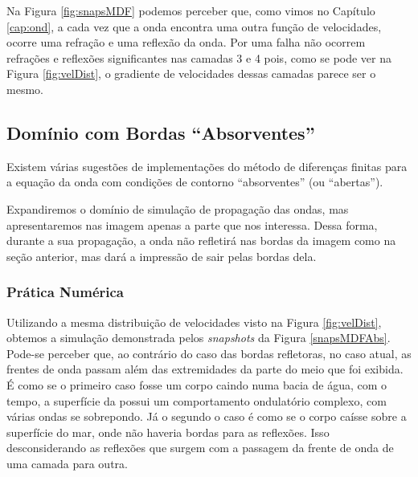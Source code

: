                 Na Figura \ref{fig:snapsMDF} podemos perceber que, como vimos no Capítulo \ref{cap:ond}, a cada vez que a onda encontra uma outra função de velocidades, ocorre uma refração e uma reflexão da onda. Por uma falha não ocorrem refrações e reflexões significantes nas camadas 3 e 4 pois, como se pode ver na Figura \ref{fig:velDist}, o gradiente de velocidades dessas camadas parece ser o mesmo.

	    \subsection{Domínio com Bordas ``Absorventes''}
	        
            Existem várias sugestões de implementações do método de diferenças finitas para a equação da onda com condições de contorno ``absorventes'' (ou ``abertas''). 
            
            Expandiremos o domínio de simulação de propagação das ondas, mas apresentaremos nas imagem apenas a parte que nos interessa. Dessa forma, durante a sua propagação, a onda não refletirá nas bordas da imagem como na seção anterior, mas dará a impressão de sair pelas bordas dela.
	        
            \subsubsection{Prática Numérica}
            
                Utilizando a mesma distribuição de velocidades visto na Figura \ref{fig:velDist}, obtemos a simulação demonstrada pelos \textit{snapshots} da Figura \ref{snapsMDFAbs}. Pode-se perceber que, ao contrário do caso das bordas refletoras, no caso atual, as frentes de onda passam além das extremidades da parte do meio que foi exibida. É como se o primeiro caso fosse um corpo caindo numa bacia de água, com o tempo, a superfície da possui um comportamento ondulatório complexo, com várias ondas se sobrepondo. Já o segundo o caso é como se o corpo caísse sobre a superfície do mar, onde não haveria bordas para as reflexões. Isso desconsiderando as reflexões que surgem com a passagem da frente de onda de uma camada para outra.
                
